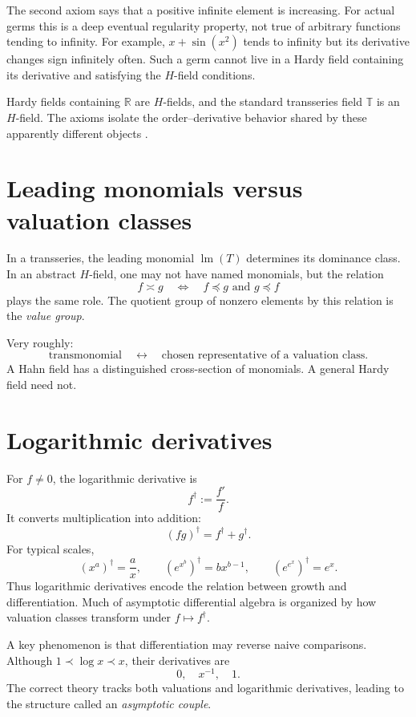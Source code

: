 \documentclass[11pt,openany]{book}
\theoremstyle{definition}
\theoremstyle{plain}
\theoremstyle{remark}
\newcommand{\R}{\mathbb{R}}
\newcommand{\T}{\mathbb{T}}
\newcommand{\precdom}{\prec}
\DeclareMathOperator{\lm}{lm}
\begin{document}
The second axiom says that a positive infinite element is increasing. For actual germs this is a deep eventual regularity property, not true of arbitrary functions tending to infinity. For example, $x+\sin(x^2)$ tends to infinity but its derivative changes sign infinitely often. Such a germ cannot live in a Hardy field containing its derivative and satisfying the $H$-field conditions.

Hardy fields containing $\R$ are $H$-fields, and the standard transseries field $\T$ is an $H$-field. The axioms isolate the order--derivative behavior shared by these apparently different objects \cite{adh-numbers,adh-book}.

\section{Leading monomials versus valuation classes}

In a transseries, the leading monomial $\lm(T)$ determines its dominance class. In an abstract $H$-field, one may not have named monomials, but the relation
\[
 f\asymp g
 \quad\Longleftrightarrow\quad
 f\preceq g\text{ and }g\preceq f
\]
plays the same role. The quotient group of nonzero elements by this relation is the \emph{value group}.

Very roughly:
\[
 \boxed{\text{transmonomial}}
 \quad\longleftrightarrow\quad
 \boxed{\text{chosen representative of a valuation class}}.
\]
A Hahn field has a distinguished cross-section of monomials. A general Hardy field need not.

\section{Logarithmic derivatives}

For $f\ne0$, the logarithmic derivative is
\begin{equation}\label{eq:logarithmic-derivative}
 f^\dagger:=\frac{f'}f.
\end{equation}
It converts multiplication into addition:
\[
 (fg)^\dagger=f^\dagger+g^\dagger.
\]
For typical scales,
\[
 (x^a)^\dagger=\frac ax,
 \qquad
 (e^{x^b})^\dagger=bx^{b-1},
 \qquad
 (e^{e^x})^\dagger=e^x.
\]
Thus logarithmic derivatives encode the relation between growth and differentiation. Much of asymptotic differential algebra is organized by how valuation classes transform under $f\mapsto f^\dagger$.

A key phenomenon is that differentiation may reverse naive comparisons. Although $1\precdom\log x\precdom x$, their derivatives are
\[
 0,\quad x^{-1},\quad1.
\]
The correct theory tracks both valuations and logarithmic derivatives, leading to the structure called an \emph{asymptotic couple}.
\end{document}
